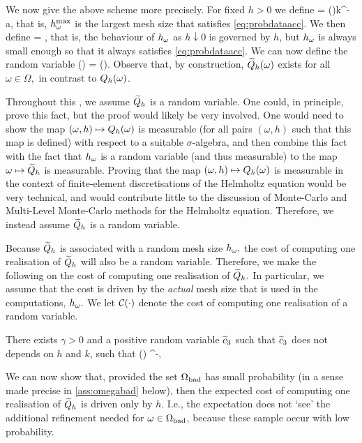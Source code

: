 We now give the above scheme more precisely. For fixed $h>0$ we define
\beq\label{eq:hmaxomega}
\hmaxomega = \Co(\omega)k^{-a},
\eeq
that is, $h^{\max}_{\omega}$ is the largest mesh size that satisfies \cref{eq:probdataacc}. We then define
\beq\label{eq:homega}
\homega = \min{},
\eeq
that is, the behaviour of $h_{\omega}$ as $h\downarrow 0$ is governed by $h$, but $h_{\omega}$ is always small enough so that it always satisfies \cref{eq:probdataacc}. We can now define the random variable
\beq\label{eq:Qhtilde}
\Qhtilde(\omega) = \Qhomega(\omega).
\eeq
Observe that, by construction, $\widetilde{Q}_{h}(\omega)$ exists for all $\omega \in \Omega,$ in contrast to $Q_{h}(\omega)$.

\label{rem:Qhtilderandom}
Throughout this , we assume $\widetilde{Q}_{h}$ is a random variable. One could, in principle, prove this fact, but the proof would likely be very involved. One would need to show the map $(\omega,h) \mapsto Q_{h}(\omega)$ is measurable (for all pairs $(\omega,h)$ such that this map is defined) with respect to a suitable $\sigma$-algebra, and then combine this fact with the fact that $h_{\omega}$ is a random variable (and thus measurable) to the map $\omega \mapsto \widetilde{Q}_{h}$ is measurable. Proving that the map $(\omega,h) \mapsto Q_{h}(\omega)$ is measurable in the context of finite-element discretisations of the Helmholtz equation would be very technical, and would contribute little to the discussion of Monte-Carlo and Multi-Level Monte-Carlo methods for the Helmholtz equation. Therefore, we instead assume $\widetilde{Q}_{h}$ is a random variable.
\ere

Because $\widetilde{Q}_{h}$ is associated with a random mesh size $h_{\omega},$ the cost of computing one realisation of $\widetilde{Q}_{h}$ will also be a random variable. Therefore, we make the following  on the cost of computing one realisation of $\widetilde{Q}_{h}.$ In particular, we assume that the cost is driven by the \emph{actual} mesh size that is used in the computations, $h_{\omega}.$ We let $\Cost{\cdot}$ denote the cost of computing one realisation of a random variable.

\label{ass:costone}
There exists $ \gamma > 0$ and a positive random variable $\widetilde{c}_{3}$ such that $\widetilde{c}_{3}$ does not depends on $h$ and $k$, such that
\beqs
\Cost{\Qhtilde(\omega)} \leq \cthtilde(\omega) \homega^{-\gamma},
\eeqs
\eas

We can now show that, provided the set $\Omega_{\mathrm{bad}}$ has small probability (in a sense made precise in \cref{ass:omegabad} below), then the expected cost of computing one realisation of $\widetilde{Q}_{h}$ is driven only by $h.$ I.e., the expectation does not `see' the additional refinement needed for $\omega \in \Omega_{\mathrm{bad}}$, because these sample occur with low probability.

